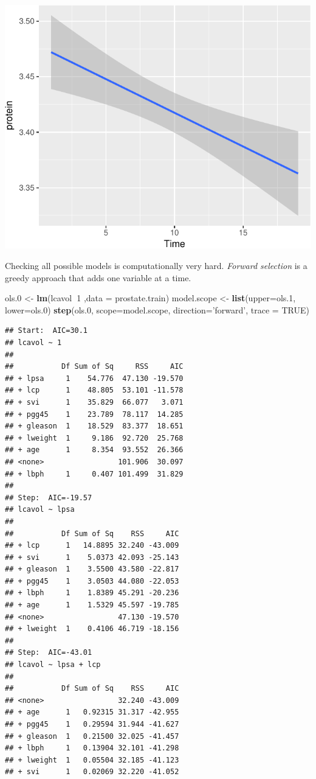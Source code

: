 \documentclass[]{book}
\newenvironment{Shaded}{\begin{snugshade}}{\end{snugshade}}
\newcommand{\KeywordTok}[1]{\textcolor[rgb]{0.13,0.29,0.53}{\textbf{#1}}}
\newcommand{\DataTypeTok}[1]{\textcolor[rgb]{0.13,0.29,0.53}{#1}}
\newcommand{\DecValTok}[1]{\textcolor[rgb]{0.00,0.00,0.81}{#1}}
\newcommand{\StringTok}[1]{\textcolor[rgb]{0.31,0.60,0.02}{#1}}
\newcommand{\OtherTok}[1]{\textcolor[rgb]{0.56,0.35,0.01}{#1}}
\newcommand{\OperatorTok}[1]{\textcolor[rgb]{0.81,0.36,0.00}{\textbf{#1}}}
\newcommand{\NormalTok}[1]{#1}
\theoremstyle{definition}
\theoremstyle{definition}
\theoremstyle{definition}
\theoremstyle{remark}
\begin{document}
\includegraphics[width=0.5\linewidth]{Rcourse_files/figure-latex/unnamed-chunk-239-1}

Checking all possible models is computationally very hard. \emph{Forward
selection} is a greedy approach that adds one variable at a time.

\begin{Shaded}
\begin{Highlighting}[]
\NormalTok{ols.}\DecValTok{0}\NormalTok{ <-}\StringTok{ }\KeywordTok{lm}\NormalTok{(lcavol}\OperatorTok{~}\DecValTok{1}\NormalTok{ ,}\DataTypeTok{data =}\NormalTok{ prostate.train)}
\NormalTok{model.scope <-}\StringTok{ }\KeywordTok{list}\NormalTok{(}\DataTypeTok{upper=}\NormalTok{ols.}\DecValTok{1}\NormalTok{, }\DataTypeTok{lower=}\NormalTok{ols.}\DecValTok{0}\NormalTok{)}
\KeywordTok{step}\NormalTok{(ols.}\DecValTok{0}\NormalTok{, }\DataTypeTok{scope=}\NormalTok{model.scope, }\DataTypeTok{direction=}\StringTok{'forward'}\NormalTok{, }\DataTypeTok{trace =} \OtherTok{TRUE}\NormalTok{)}
\end{Highlighting}
\end{Shaded}

\begin{verbatim}
## Start:  AIC=30.1
## lcavol ~ 1
## 
##           Df Sum of Sq     RSS     AIC
## + lpsa     1    54.776  47.130 -19.570
## + lcp      1    48.805  53.101 -11.578
## + svi      1    35.829  66.077   3.071
## + pgg45    1    23.789  78.117  14.285
## + gleason  1    18.529  83.377  18.651
## + lweight  1     9.186  92.720  25.768
## + age      1     8.354  93.552  26.366
## <none>                 101.906  30.097
## + lbph     1     0.407 101.499  31.829
## 
## Step:  AIC=-19.57
## lcavol ~ lpsa
## 
##           Df Sum of Sq    RSS     AIC
## + lcp      1   14.8895 32.240 -43.009
## + svi      1    5.0373 42.093 -25.143
## + gleason  1    3.5500 43.580 -22.817
## + pgg45    1    3.0503 44.080 -22.053
## + lbph     1    1.8389 45.291 -20.236
## + age      1    1.5329 45.597 -19.785
## <none>                 47.130 -19.570
## + lweight  1    0.4106 46.719 -18.156
## 
## Step:  AIC=-43.01
## lcavol ~ lpsa + lcp
## 
##           Df Sum of Sq    RSS     AIC
## <none>                 32.240 -43.009
## + age      1   0.92315 31.317 -42.955
## + pgg45    1   0.29594 31.944 -41.627
## + gleason  1   0.21500 32.025 -41.457
## + lbph     1   0.13904 32.101 -41.298
## + lweight  1   0.05504 32.185 -41.123
## + svi      1   0.02069 32.220 -41.052
\end{verbatim}
\end{document}
